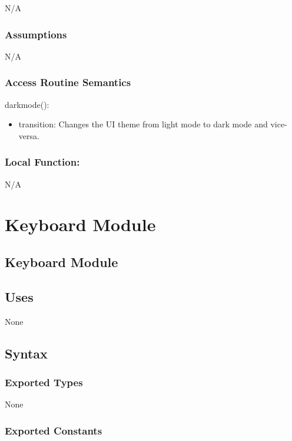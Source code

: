 \documentclass[12pt]{article}
\begin{document}
N/A

\subsubsection* {Assumptions}

N/A

\subsubsection* {Access Routine Semantics}

\noindent darkmode():
\begin{itemize}
  \item transition: Changes the UI theme from light mode to dark mode and vice-versa.
\end{itemize}

\subsubsection*{Local Function:}

N/A

\newpage

\section {Keyboard Module}

\subsection* {Keyboard Module}

\subsection* {Uses}

None

\subsection* {Syntax}

\subsubsection* {Exported Types}

None

\subsubsection* {Exported Constants}
\end{document}
